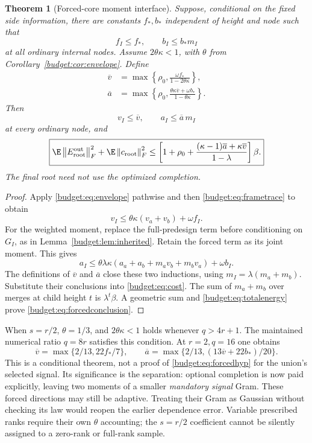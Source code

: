 \documentclass[11pt,oneside,openany,a4paper]{book}
\numberwithin{equation}{chapter}
\newtheorem{theorem}{Theorem}[chapter]
\theoremstyle{definition}
\theoremstyle{remark}
\newcommand{\F}[1]{\left\lVert#1\right\rVert_F}
\begin{document}
\begin{theorem}[Forced-core moment interface]\label{budget:thm:forced}
Suppose, conditional on the fixed side information, there are constants $f_*,b_*$ independent of height and node such that
\begin{equation}\label{budget:eq:forcedhyp}
 f_I\le f_*,\qquad b_I\le b_*m_I
\end{equation}
at all ordinary internal nodes. Assume $2\theta\kappa<1$, with $\theta$ from Corollary~\ref{budget:cor:envelope}. Define
\begin{align*}
 \overline v&=\max\left\{\rho_0,\frac{\omega f_*}{1-2\theta\kappa}\right\},\\
 \overline a&=\max\left\{\rho_0,
 \frac{\theta\kappa\overline v+\omega b_*}{1-\theta\kappa}\right\}.
\end{align*}
Then
\[
 v_I\le\overline v,\qquad a_I\le\overline a\,m_I
\]
at every ordinary node, and
\begin{equation}\label{budget:eq:forcedconclusion}
 \boxed{\E\F{E_{\rm root}^{\rm out}}^2+\E\F{c_{\rm root}}^2
 \le\left[1+\rho_0+
 \frac{(\kappa-1)\overline a+\kappa\overline v}{1-\lambda}\right]\beta.}
\end{equation}
The final root need not use the optimized completion.
\end{theorem}
\begin{proof}
Apply \eqref{budget:eq:envelope} pathwise and then \eqref{budget:eq:frametrace} to obtain
\[
 v_I\le\theta\kappa(v_a+v_b)+\omega f_I.
\]
For the weighted moment, replace the full-predesign term before conditioning on $G_I$, as in Lemma~\ref{budget:lem:inherited}. Retain the forced term as its joint moment. This gives
\[
 a_I\le\theta\lambda\kappa(a_a+a_b+m_av_b+m_bv_a)+\omega b_I.
\]
The definitions of $\overline v$ and $\overline a$ close these two inductions, using $m_I=\lambda(m_a+m_b)$. Substitute their conclusions into \eqref{budget:eq:cost}. The sum of $m_a+m_b$ over merges at child height $t$ is $\lambda^t\beta$. A geometric sum and \eqref{budget:eq:totalenergy} prove \eqref{budget:eq:forcedconclusion}.
\end{proof}

When $s=r/2$, $\theta=1/3$, and $2\theta\kappa<1$ holds whenever $q>4r+1$. The maintained numerical ratio $q=8r$ satisfies this condition. At $r=2,q=16$ one obtains
\[
 \overline v=\max\{2/13,22f_*/7\},\qquad
 \overline a=\max\{2/13,(13\overline v+22b_*)/20\}.
\]
This is a conditional theorem, not a proof of \eqref{budget:eq:forcedhyp} for the union's selected signal. Its significance is the separation: optional completion is now paid explicitly, leaving two moments of a smaller \emph{mandatory signal} Gram. These forced directions may still be adaptive. Treating their Gram as Gaussian without checking its law would reopen the earlier dependence error. Variable prescribed ranks require their own $\theta$ accounting; the $s=r/2$ coefficient cannot be silently assigned to a zero-rank or full-rank sample.
\end{document}
